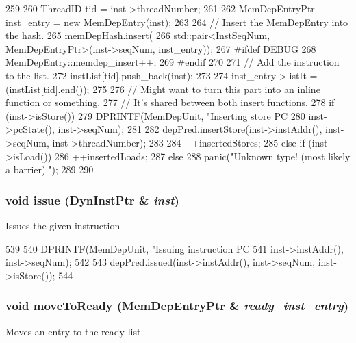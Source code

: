 \begin{DoxyCode}
259 {
260     ThreadID tid = inst->threadNumber;
261 
262     MemDepEntryPtr inst_entry = new MemDepEntry(inst);
263 
264     // Insert the MemDepEntry into the hash.
265     memDepHash.insert(
266         std::pair<InstSeqNum, MemDepEntryPtr>(inst->seqNum, inst_entry));
267 #ifdef DEBUG
268     MemDepEntry::memdep_insert++;
269 #endif
270 
271     // Add the instruction to the list.
272     instList[tid].push_back(inst);
273 
274     inst_entry->listIt = --(instList[tid].end());
275 
276     // Might want to turn this part into an inline function or something.
277     // It's shared between both insert functions.
278     if (inst->isStore()) {
279         DPRINTF(MemDepUnit, "Inserting store PC %
280                 inst->pcState(), inst->seqNum);
281 
282         depPred.insertStore(inst->instAddr(), inst->seqNum, inst->threadNumber);
283 
284         ++insertedStores;
285     } else if (inst->isLoad()) {
286         ++insertedLoads;
287     } else {
288         panic("Unknown type! (most likely a barrier).");
289     }
290 }
\end{DoxyCode}
\hypertarget{classMemDepUnit_a6abd0e2390123c2fe82ab377b76b5347}{
\subsubsection[{issue}]{\setlength{\rightskip}{0pt plus 5cm}void issue ({\bf DynInstPtr} \& {\em inst})}}
\label{classMemDepUnit_a6abd0e2390123c2fe82ab377b76b5347}
Issues the given instruction 


\begin{DoxyCode}
539 {
540     DPRINTF(MemDepUnit, "Issuing instruction PC %
541             inst->instAddr(), inst->seqNum);
542 
543     depPred.issued(inst->instAddr(), inst->seqNum, inst->isStore());
544 }
\end{DoxyCode}
\hypertarget{classMemDepUnit_ac1e743ad9d95132dd76847a784259e11}{
\subsubsection[{moveToReady}]{\setlength{\rightskip}{0pt plus 5cm}void moveToReady ({\bf MemDepEntryPtr} \& {\em ready\_\-inst\_\-entry})}}
\label{classMemDepUnit_ac1e743ad9d95132dd76847a784259e11}
Moves an entry to the ready list. 


